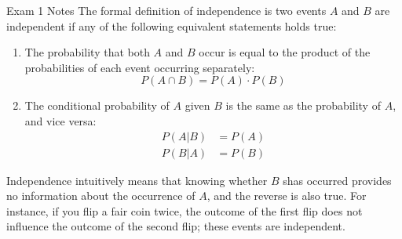 \begin{examnotes}{Exam 1 Notes}
    The formal definition of independence is two events $A$ and $B$ are independent if any of the following equivalent statements holds true:
    \begin{enumerate}
        \item The probability that both $A$ and $B$ occur is equal to the product of the probabilities of each event occurring separately:
        \begin{equation*}
            P(A \cap B) = P(A) \cdot P(B)
        \end{equation*}
        \item The conditional probability of $A$ given $B$ is the same as the probability of $A$, and vice versa:
        \begin{align*}
            P(A|B) & = P(A) \\
            P(B|A) & = P(B)
        \end{align*}
    \end{enumerate}
    Independence intuitively means that knowing whether $B$ shas occurred provides no information about the occurrence of $A$, and the reverse is also true. For instance, if you flip a fair coin twice,
    the outcome of the first flip does not influence the outcome of the second flip; these events are independent.
\end{examnotes}